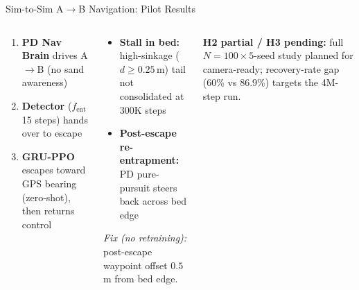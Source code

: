 \documentclass[aspectratio=169, 10pt]{beamer}
\newcommand{\keyword}[1]{\textbf{\color{MarsLight}#1}}
\newcommand{\warn}{\textcolor{WarnOrange}{\faExclamationTriangle}\;}
\begin{document}
\begin{frame}{Sim-to-Sim A$\to$B Navigation: Pilot Results}
\begin{columns}[T]

\begin{tcolorbox}[mycard, title={\faSitemap\; Three-Layer Dual-Brain Handoff}]
  \scriptsize
  \begin{enumerate}[leftmargin=1.4em, itemsep=2pt, label={\color{MarsLight}\bfseries\arabic*.}]
    \item \keyword{PD Nav Brain} drives A$\to$B (no sand awareness)
    \item \keyword{Detector} ($f_\text{ent}$ 15 steps) hands over to escape
    \item \keyword{GRU-PPO} escapes toward GPS bearing (zero-shot), then returns control
  \end{enumerate}
\end{tcolorbox}

\vspace{0.15em}
\begin{tcolorbox}[mycard, title={\faExclamationTriangle\; Two Goal-Completion Failure Modes}]
  \tiny
  \begin{itemize}[leftmargin=1em, itemsep=2pt]
    \item[\warn] \textbf{Stall in bed:} high-sinkage ($d{\geq}0.25$\,m) tail not consolidated at 300K steps
    \item[\warn] \textbf{Post-escape re-entrapment:} PD pure-pursuit steers back across bed edge
  \end{itemize}
  \vspace{2pt}
  \textit{Fix (no retraining):} post-escape waypoint offset $0.5$\,m from bed edge.
\end{tcolorbox}

\vspace{0.15em}
\begin{tcolorbox}[highlight]
  \tiny\centering
  \textbf{\warn H2 partial / H3 pending:} full $N{=}100\times5$-seed study planned for camera-ready;
  recovery-rate gap (60\% vs 86.9\%) targets the 4M-step run.
\end{tcolorbox}

\end{columns}
\end{frame}
\end{document}
